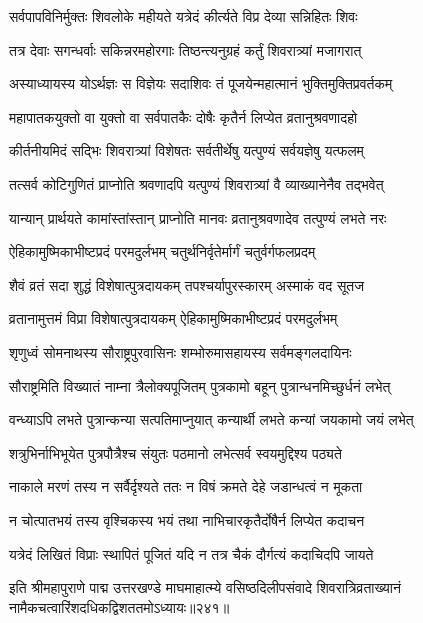 
\twolineshloka
{सर्वपापविनिर्मुक्तः शिवलोके महीयते}
{यत्रेदं कीर्त्यते विप्र\footnotemark{}  देव्या सन्निहितः शिवः} %


\twolineshloka
{तत्र देवाः सगन्धर्वाः सकिन्नरमहोरगाः}
{तिष्ठन्त्यनुग्रहं कर्तुं शिवरात्र्यां मजागरात्} %

\twolineshloka
{अस्याध्यायस्य योऽर्थज्ञः स विज्ञेयः सदाशिवः}
{तं पूजयेन्महात्मानं भुक्तिमुक्तिप्रवर्तकम्} %

\twolineshloka
{महापातकयुक्तो वा युक्तो वा सर्वपातकैः}
{दोषैः कृतैर्न लिप्येत व्रतानुश्रवणादहो} %

\twolineshloka
{कीर्तनीयमिदं सद्भिः शिवरात्र्यां विशेषतः}
{सर्वतीर्थेषु यत्पुण्यं सर्वयज्ञेषु यत्फलम्} %

\twolineshloka
{तत्सर्व कोटिगुणितं प्राप्नोति श्रवणादपि}
{यत्पुण्यं शिवरात्र्यां वै व्याख्यानेनैव तद्भवेत्} %

\twolineshloka
{यान्यान् प्रार्थयते कामांस्तांस्तान् प्राप्नोति मानवः}
{व्रतानुश्रवणादेव तत्पुण्यं लभते नरः} %


\twolineshloka
{ऐहिकामुष्मिकाभीष्टप्रदं परमदुर्लभम्}
{चतुर्थनिर्वृतेर्मार्गं चतुर्वर्गफलप्रदम्} %

\twolineshloka
{शैवं व्रतं सदा शुद्धं विशेषात्पुत्रदायकम्}
{तपश्चर्यापुरस्कारम् अस्माकं वद सूतज\footnotemark{}} %



\twolineshloka
{व्रतानामुत्तमं विप्रा\footnotemark{} विशेषात्पुत्रदायकम्}
{ऐहिकामुष्मिकाभीष्टप्रदं परमदुर्लभम्} %


\twolineshloka
{शृणुध्वं\footnotemark{} सोमनाथस्य सौराष्ट्रपुरवासिनः}
{शम्भोरुमासहायस्य सर्वमङ्गलदायिनः} %


\twolineshloka
{सौराष्ट्रमिति विख्यातं नाम्ना त्रैलोक्यपूजितम्}
{पुत्रकामो बहून् पुत्रान्धनमिच्छुर्धनं लभेत्} %

\twolineshloka
{वन्ध्याऽपि लभते पुत्रान्कन्या सत्पतिमाप्नुयात्}
{कन्यार्थी लभते कन्यां जयकामो जयं लभेत्} %

\twolineshloka
{शत्रुभिर्नाभिभूयेत पुत्रपौत्रैश्च संयुतः}
{पठमानो लभेत्सर्व स्वयमुद्दिश्य पठ्यते} %

\twolineshloka
{नाकाले मरणं तस्य न सर्वैर्दृश्यते ततः}
{न विषं क्रमते देहे जडान्धत्वं न मूकता} %

\twolineshloka
{न चोत्पातभयं तस्य वृश्चिकस्य भयं तथा}
{नाभिचारकृतैर्दोषैर्न लिप्येत कदाचन} %

\twolineshloka
{यत्रेदं लिखितं विप्राः\footnotemark{} स्थापितं पूजितं यदि}
{न तत्र चैकं दौर्गत्यं कदाचिदपि जायते} %


इति श्रीमहापुराणे पाद्म उत्तरखण्डे माघमाहात्म्ये वसिष्ठदिलीपसंवादे शिवरात्रिव्रताख्यानं नामैकचत्वारिंशदधिकद्विशततमोऽध्यायः॥२४१॥


\genMangalaShloka